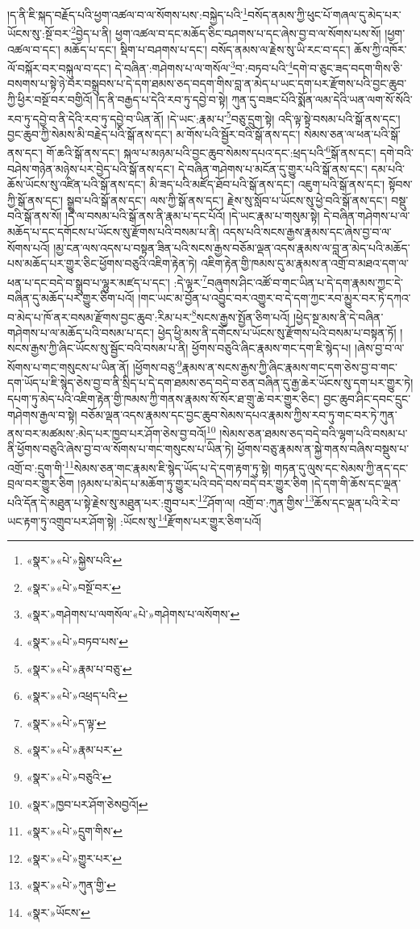 །ད་ནི་ཇི་སྐད་བརྗོད་པའི་ཕྱག་འཚལ་བ་ལ་སོགས་པས་:བསྐྱེད་པའི་\footnote{«སྣར་»«པེ་»སྐྱེས་པའི་}བསོད་ནམས་ཀྱི་ཕུང་པོ་གཞལ་དུ་མེད་པར་ཡོངས་སུ་:སྔོ་བར་\footnote{«སྣར་»«པེ་»བསྔོ་བར་}བྱེད་པ་ནི། ཕྱག་འཚལ་བ་དང་མཆོད་ཅིང་བཤགས་པ་དང་ཞེས་བྱ་བ་ལ་སོགས་པས་སོ། །ཕྱག་འཚལ་བ་དང་། མཆོད་པ་དང་། སྡིག་པ་བཤགས་པ་དང་། བསོད་ནམས་ལ་རྗེས་སུ་ཡི་རང་བ་དང་། ཆོས་ཀྱི་འཁོར་ལོ་བསྐོར་བར་བསྐུལ་བ་དང་། དེ་བཞིན་:གཤེགས་པ་ལ་གསོལ་\footnote{«སྣར་»གཤེགས་པ་ལགསོལ་«པེ་»གཤེགས་པ་ལསོགས་}བ་:བཏབ་པའི་\footnote{«སྣར་»«པེ་»བཏབ་པས་}དགེ་བ་ཅུང་ཟད་བདག་གིས་ཅི་བསགས་པ་སྟེ་ཉེ་བར་བསྒྲུབས་པ་དེ་དག་ཐམས་ཅད་བདག་གིས་བླ་ན་མེད་པ་ཡང་དག་པར་རྫོགས་པའི་བྱང་ཆུབ་ཀྱི་ཕྱིར་བསྔོ་བར་བགྱིའོ། །ད་ནི་བརྒྱད་པ་དེའི་རབ་ཏུ་དབྱེ་བ་སྟེ། ཀུན་དུ་བཟང་པོའི་སྨོན་ལམ་དེའི་ཡན་ལག་སོ་སོའི་རབ་ཏུ་དབྱེ་བ་ནི་དེའི་རབ་ཏུ་དབྱེ་བ་ཡིན་ནོ། །དེ་ཡང་:རྣམ་པ་\footnote{«སྣར་»«པེ་»རྣམ་པ་བཅུ་}བཅུ་དྲུག་སྟེ། འདི་ལྟ་སྟེ་བསམ་པའི་སྒོ་ནས་དང་། བྱང་ཆུབ་ཀྱི་སེམས་མི་བརྗེད་པའི་སྒོ་ནས་དང་། མ་གོས་པའི་སྦྱོར་བའི་སྒོ་ནས་དང་། སེམས་ཅན་ལ་ཕན་པའི་སྒོ་ནས་དང་། གོ་ཆའི་སྒོ་ནས་དང་། སྐལ་པ་མཉམ་པའི་བྱང་ཆུབ་སེམས་དཔའ་དང་:ཕྲད་པའི་\footnote{«སྣར་»«པེ་»འཕྲད་པའི་}སྒོ་ནས་དང་། དགེ་བའི་བཤེས་གཉེན་མཉེས་པར་བྱེད་པའི་སྒོ་ནས་དང་། དེ་བཞིན་གཤེགས་པ་མངོན་དུ་གྱུར་པའི་སྒོ་ནས་དང་། དམ་པའི་ཆོས་ཡོངས་སུ་འཛིན་པའི་སྒོ་ནས་དང་། མི་ཟད་པའི་མཛོད་ཐོབ་པའི་སྒོ་ནས་དང་། འཇུག་པའི་སྒོ་ནས་དང་། སྟོབས་ཀྱི་སྒོ་ནས་དང་། སྒྲུབ་པའི་སྒོ་ནས་དང་། ལས་ཀྱི་སྒོ་ནས་དང་། རྗེས་སུ་སློབ་པ་ཡོངས་སུ་ཕྱེ་བའི་སྒོ་ནས་དང་། བསྡུ་བའི་སྒོ་ནས་སོ། །དེ་ལ་བསམ་པའི་སྒོ་ནས་ནི་རྣམ་པ་དང་པོའོ། །དེ་ཡང་རྣམ་པ་གསུམ་སྟེ། དེ་བཞིན་གཤེགས་པ་ལ་མཆོད་པ་དང་དགོངས་པ་ཡོངས་སུ་རྫོགས་པའི་བསམ་པ་ནི། འདས་པའི་སངས་རྒྱས་རྣམས་དང་ཞེས་བྱ་བ་ལ་སོགས་པའོ། །མྱ་ངན་ལས་འདས་པ་བསྟན་ཟིན་པའི་སངས་རྒྱས་བཅོམ་ལྡན་འདས་རྣམས་ལ་བླ་ན་མེད་པའི་མཆོད་པས་མཆོད་པར་གྱུར་ཅིང་ཕྱོགས་བཅུའི་འཇིག་རྟེན་ཏེ། འཇིག་རྟེན་གྱི་ཁམས་དུ་མ་རྣམས་ན་འགྲོ་བ་མཐའ་དག་ལ་ཕན་པ་དང་བདེ་བ་སྒྲུབ་པ་ལྷུར་མཛད་པ་དང་། :དེ་ལྟར་\footnote{«སྣར་»«པེ་»ད་ལྟ་}བཞུགས་ཤིང་འཚོ་བ་གང་ཡིན་པ་དེ་དག་རྣམས་ཀྱང་དེ་བཞིན་དུ་མཆོད་པར་གྱུར་ཅིག་པའོ། །གང་ཡང་མ་བྱོན་པ་འབྱུང་བར་འགྱུར་བ་དེ་དག་ཀྱང་རབ་མྱུར་བར་ཏེ་དཀའ་བ་མེད་པ་ཁོ་ནར་བསམ་རྫོགས་བྱང་ཆུབ་:རིམ་པར་\footnote{«སྣར་»«པེ་»རྣམ་པར་}སངས་རྒྱས་སྤྱོན་ཅིག་པའོ། །ཕྱེད་སྔ་མས་ནི་དེ་བཞིན་གཤེགས་པ་ལ་མཆོད་པའི་བསམ་པ་དང་། ཕྱེད་ཕྱི་མས་ནི་དགོངས་པ་ཡོངས་སུ་རྫོགས་པའི་བསམ་པ་བསྟན་ཏོ། །སངས་རྒྱས་ཀྱི་ཞིང་ཡོངས་སུ་སྦྱོང་བའི་བསམ་པ་ནི། ཕྱོགས་བཅུའི་ཞིང་རྣམས་གང་དག་ཇི་སྙེད་པ། །ཞེས་བྱ་བ་ལ་སོགས་པ་གང་གསུངས་པ་ཡིན་ནོ། །ཕྱོགས་བཅུ་\footnote{«སྣར་»«པེ་»བཅུའི་}རྣམས་ན་སངས་རྒྱས་ཀྱི་ཞིང་རྣམས་གང་དག་ཅེས་བྱ་བ་གང་དག་ཡོད་པ་ཇི་སྙེད་ཅེས་བྱ་བ་ནི་སྲིད་པ་དེ་དག་ཐམས་ཅད་བདེ་བ་ཅན་བཞིན་དུ་རྒྱ་ཆེར་ཡོངས་སུ་དག་པར་གྱུར་ཏེ། དཔག་ཏུ་མེད་པའི་འཇིག་རྟེན་གྱི་ཁམས་ཀྱི་གནས་རྣམས་སོ་སོར་ཐ་གྲུ་ཆེ་བར་གྱུར་ཅིང་། བྱང་ཆུབ་ཤིང་དབང་དྲུང་གཤེགས་རྒྱལ་བ་སྟེ། བཅོམ་ལྡན་འདས་རྣམས་དང་བྱང་ཆུབ་སེམས་དཔའ་རྣམས་ཀྱིས་རབ་ཏུ་གང་བར་ཏེ་ཀུན་ནས་བར་མཚམས་:མེད་པར་ཁྱབ་པར་ཤོག་ཅེས་བྱ་བའོ།\footnote{«སྣར་»ཁྱབ་པར་ཤོག་ཅེསབྱའོ།} །སེམས་ཅན་ཐམས་ཅད་བདེ་བའི་ལྷག་པའི་བསམ་པ་ནི་ཕྱོགས་བཅུའི་ཞེས་བྱ་བ་ལ་སོགས་པ་གང་གསུངས་པ་ཡིན་ཏེ། ཕྱོགས་བཅུ་རྣམས་ན་སྐྱེ་གནས་བཞིས་བསྡུས་པ་འགྲོ་བ་:དྲུག་གི་\footnote{«སྣར་»«པེ་»དྲུག་གིས་}སེམས་ཅན་གང་རྣམས་ཇི་སྙེད་ཡོད་པ་དེ་དག་རྟག་ཏུ་སྟེ། གཏན་དུ་ལུས་དང་སེམས་ཀྱི་ནད་དང་བྲལ་བར་གྱུར་ཅིག །ཉམས་པ་མེད་པ་མཆོག་ཏུ་གྱུར་པའི་བདེ་བས་བདེ་བར་གྱུར་ཅིག །དེ་དག་གི་ཆོས་དང་ལྡན་པའི་དོན་དེ་མཐུན་པ་སྟེ་རྗེས་སུ་མཐུན་པར་:གྲུབ་པར་\footnote{«སྣར་»«པེ་»གྱུར་པར་}ཤོག་ལ། འགྲོ་བ་:ཀུན་གྱིས་\footnote{«སྣར་»«པེ་»ཀུན་གྱི་}ཆོས་དང་ལྡན་པའི་རེ་བ་ཡང་རྟག་ཏུ་འགྲུབ་པར་ཤོག་སྟེ། :ཡོངས་སུ་\footnote{«སྣར་»ཡོངས་}རྫོགས་པར་གྱུར་ཅིག་པའོ། 